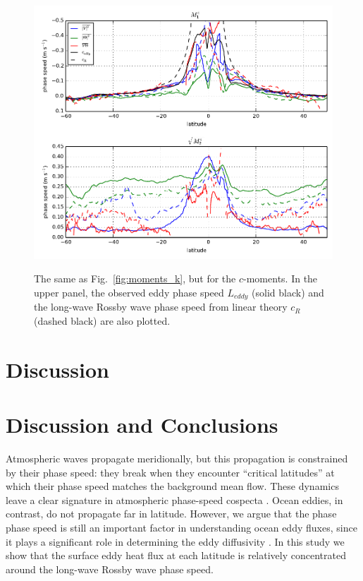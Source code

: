\documentclass[10pt]{article}
\begin{document}
\begin{figure}[t]
  \noindent\includegraphics{../figures/moments_c.pdf}\\
  \caption{The same as Fig.~\ref{fig:moments_k}, but for the $c$-moments. In the upper panel, the observed eddy phase speed $L_{eddy}$ (solid black) and the long-wave Rossby wave phase speed from linear theory $c_R$ (dashed black) are also plotted. }
  \label{fig:moments_c}
\end{figure}
\section{Discussion}

\section{Discussion and Conclusions}
Atmospheric waves propagate meridionally, but this propagation is constrained by their phase speed: they break when they encounter ``critical latitudes'' at which their phase speed matches the background mean flow. These dynamics leave a clear signature in atmospheric phase-speed cospecta \citep{ChenHeld2007}. Ocean eddies, in contrast, do not propagate far in latitude. However, we argue that the phase phase speed is still an important factor in understanding ocean eddy fluxes, since it plays a significant role in determining the eddy diffusivity \citep{AbernatheyEtAl2010,FerrariNikurashin2010}. In this study we show that the surface eddy heat flux at each latitude is relatively concentrated around the long-wave Rossby wave phase speed.
\end{document}
